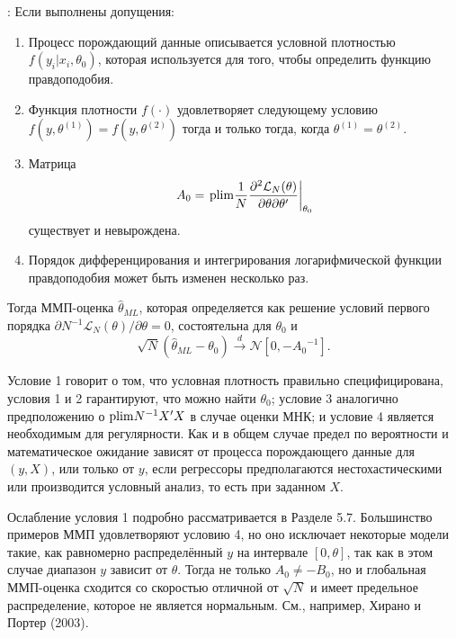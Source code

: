 \begin{proposition}: Если выполнены допущения:
\begin{enumerate}
\item Процесс порождающий данные описывается условной плотностью $f(y_i|x_i,\theta_0)$, которая используется для того, чтобы определить функцию правдоподобия.
\item Функция плотности $f(\cdot)$ удовлетворяет следующему условию $f(y,\theta^{(1)})=f(y,\theta^{(2)})$ тогда и только тогда, когда $\theta^{(1)}=\theta^{(2)}$.
\item Матрица 
\begin{equation}
A_0= \left. \mathrm{plim } \frac{1}{N} \frac{\partial^2 \mathcal{L}_{N}(\theta)}{\partial \theta \partial \theta'} \right|_{\theta_0}
\end{equation}
существует и невырождена.
\item Порядок дифференцирования и интегрирования логарифмической функции правдоподобия может быть изменен несколько раз.
\end{enumerate}
Тогда ММП-оценка $\hat{\theta}_{ML}$, которая определяется как решение условий первого порядка $ \partial N^{-1} \mathcal{L}_{N}(\theta) / \partial \theta=0$, состоятельна для $\theta_0$ и
\begin{equation}
\sqrt{N} (\hat{\theta}_{ML} - \theta_0) \xrightarrow{d} \mathcal{N}[0,{-A_0}^{-1}].
\end{equation}
\end{proposition}

Условие 1 говорит о том, что условная плотность правильно специфицирована, условия 1 и 2 гарантируют, что можно найти $\theta_0$; условие 3 аналогично предположению о $\mathrm{plim } N^{-1}X'X$ в случае оценки МНК; и условие 4 является необходимым для регулярности. Как и в общем случае предел по вероятности и математическое ожидание зависят от процесса порождающего данные для $(y,X)$, или только от $y$, если регрессоры предполагаются нестохастическими или  производится условный анализ, то есть при заданном $X$.

Ослабление условия 1 подробно рассматривается в Разделе 5.7. Большинство примеров ММП удовлетворяют условию 4, но оно исключает некоторые модели такие, как равномерно распределённый $y$ на интервале $[0,\theta]$, так как в этом случае диапазон $y$ зависит от $\theta$. Тогда не только $A_0 \not= -B_0$, но и глобальная ММП-оценка сходится со скоростью отличной от $\sqrt{N}$ и имеет предельное распределение, которое не является нормальным. См., например, Хирано и Портер (2003).

